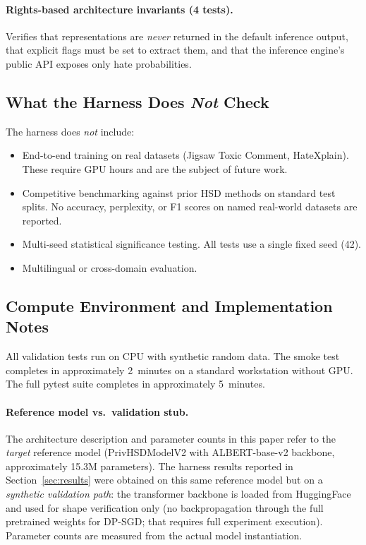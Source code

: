 \documentclass{article}
\begin{document}
\paragraph{Rights-based architecture invariants (4 tests).}
Verifies that representations are \emph{never} returned in the default
inference output, that explicit flags must be set to extract them, and
that the inference engine's public API exposes only hate probabilities.

\subsection{What the Harness Does \emph{Not} Check}

The harness does \emph{not} include:
\begin{itemize}
  \item End-to-end training on real datasets (Jigsaw Toxic Comment,
        HateXplain). These require GPU hours and are the subject of
        future work.
  \item Competitive benchmarking against prior HSD methods on standard
        test splits. No accuracy, perplexity, or F1 scores on named
        real-world datasets are reported.
  \item Multi-seed statistical significance testing. All tests use a
        single fixed seed (42).
  \item Multilingual or cross-domain evaluation.
\end{itemize}

\subsection{Compute Environment and Implementation Notes}

All validation tests run on CPU with synthetic random data.
The smoke test completes in approximately 2~minutes on a standard
workstation without GPU. The full pytest suite completes in
approximately 5~minutes.

\paragraph{Reference model vs.\ validation stub.}
The architecture description and parameter counts in this paper refer
to the \emph{target} reference model (PrivHSDModelV2 with ALBERT-base-v2
backbone, approximately 15.3M parameters). The harness results
reported in Section~\ref{sec:results} were obtained on this same
reference model but on a \emph{synthetic validation path}: the
transformer backbone is loaded from HuggingFace and used for shape
verification only (no backpropagation through the full pretrained
weights for DP-SGD; that requires full experiment execution).
Parameter counts are measured from the actual model instantiation.
\end{document}
